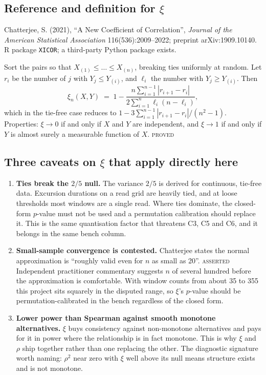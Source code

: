 \documentclass[11pt,a4paper]{article}
\newcommand{\PROVED}{\textsc{\textcolor{blue!55!black}{proved}}}
\newcommand{\ASSERTED}{\textsc{\textcolor{purple!70!black}{asserted}}}
\begin{document}
\subsection{Reference and definition for \texorpdfstring{$\xi$}{xi}}

Chatterjee, S. (2021), \enquote{A New Coefficient of Correlation}, \emph{Journal of the
American Statistical Association} 116(536):2009--2022; preprint arXiv:1909.10140.
R package \texttt{XICOR}; a third-party Python package exists.

Sort the pairs so that $X_{(1)} \le \dots \le X_{(n)}$, breaking ties uniformly at
random. Let $r_i$ be the number of $j$ with $Y_j \le Y_{(i)}$, and $\ell_i$ the number
with $Y_j \ge Y_{(i)}$. Then
%
\begin{equation}
\xi_n(X,Y) \;=\; 1 - \frac{n \sum_{i=1}^{n-1} |r_{i+1} - r_i|}
{2 \sum_{i=1}^{n} \ell_i (n - \ell_i)} ,
\label{eq:xi}
\end{equation}
%
which in the tie-free case reduces to
$1 - 3\sum_{i=1}^{n-1}|r_{i+1}-r_i| / (n^2-1)$.
Properties: $\xi \to 0$ if and only if $X$ and $Y$ are independent, and $\xi \to 1$ if
and only if $Y$ is almost surely a measurable function of $X$. \PROVED

\subsection{Three caveats on \texorpdfstring{$\xi$}{xi} that apply directly here}

\begin{enumerate}[leftmargin=1.6em,itemsep=3pt]
\item \textbf{Ties break the $2/5$ null.} The variance $2/5$ is derived for continuous,
tie-free data. Excursion durations on a read grid are heavily tied, and at loose
thresholds most windows are a single read. Where ties dominate, the closed-form $p$-value
must not be used and a permutation calibration should replace it. This is the same
quantisation factor that threatens C3, C5 and C6, and it belongs in the same bench
column.

\item \textbf{Small-sample convergence is contested.} Chatterjee states the normal
approximation is \enquote{roughly valid even for $n$ as small as 20}. \ASSERTED{}
Independent practitioner commentary suggests $n$ of several hundred before the
approximation is comfortable. With window counts from about 35 to 355 this project sits
squarely in the disputed range, so $\xi$'s $p$-value should be permutation-calibrated in
the bench regardless of the closed form.

\item \textbf{Lower power than Spearman against smooth monotone alternatives.} $\xi$ buys
consistency against non-monotone alternatives and pays for it in power where the
relationship is in fact monotone. This is why $\xi$ and $\rho$ ship together rather than
one replacing the other. The diagnostic signature worth naming: $\rho^2$ near zero with
$\xi$ well above its null means structure exists and is not monotone.
\end{enumerate}
\end{document}
